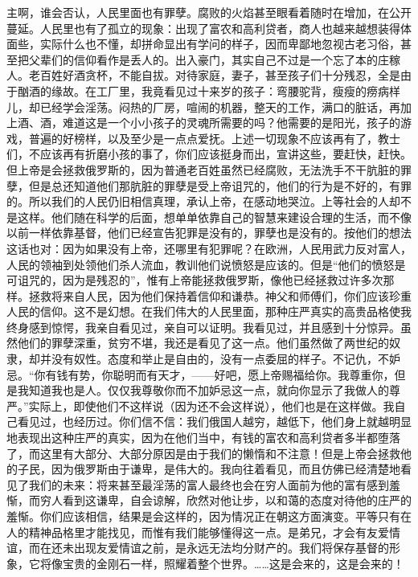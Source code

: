 \par 主啊，谁会否认，人民里面也有罪孽。腐败的火焰甚至眼看着随时在增加，在公开蔓延。人民里也有了孤立的现象：出现了富农和高利贷者，商人也越来越想装得体面些，实际什么也不懂，却拼命显出有学问的样子，因而卑鄙地忽视古老习俗，甚至把父辈们的信仰看作是丢人的。出入豪门，其实自己不过是一个忘了本的庄稼人。老百姓好酒贪杯，不能自拔。对待家庭，妻子，甚至孩子们十分残忍，全是由于酗酒的缘故。在工厂里，我竟看见过十来岁的孩子：弯腰驼背，瘦瘦的痨病样儿，却已经学会淫荡。闷热的厂房，喧闹的机器，整天的工作，满口的脏话，再加上酒、酒，难道这是一个小小孩子的灵魂所需要的吗？他需要的是阳光，孩子的游戏，普遍的好榜样，以及至少是一点点爱抚。上述一切现象不应该再有了，教士们，不应该再有折磨小孩的事了，你们应该挺身而出，宣讲这些，要赶快，赶快。但上帝是会拯救俄罗斯的，因为普通老百姓虽然已经腐败，无法洗手不干肮脏的罪孽，但是总还知道他们那肮脏的罪孽是受上帝诅咒的，他们的行为是不好的，有罪的。所以我们的人民仍旧相信真理，承认上帝，在感动地哭泣。上等社会的人却不是这样。他们随在科学的后面，想单单依靠自己的智慧来建设合理的生活，而不像以前一样依靠基督，他们已经宣告犯罪是没有的，罪孽也是没有的。按他们的想法这话也对：因为如果没有上帝，还哪里有犯罪呢？在欧洲，人民用武力反对富人，人民的领袖到处领他们杀人流血，教训他们说愤怒是应该的。但是“他们的愤怒是可诅咒的，因为是残忍的”，惟有上帝能拯救俄罗斯，像他已经拯救过许多次那样。拯救将来自人民，因为他们保持着信仰和谦恭。神父和师傅们，你们应该珍重人民的信仰。这不是幻想。在我们伟大的人民里面，那种庄严真实的高贵品格使我终身感到惊愕，我亲自看见过，亲自可以证明。我看见过，并且感到十分惊异。虽然他们的罪孽深重，贫穷不堪，我还是看见了这一点。他们虽然做了两世纪的奴隶，却并没有奴性。态度和举止是自由的，没有一点委屈的样子。不记仇，不妒忌。“你有钱有势，你聪明而有天才，——好吧，愿上帝赐福给你。我尊重你，但是我知道我也是人。仅仅我尊敬你而不加妒忌这一点，就向你显示了我做人的尊严。”实际上，即使他们不这样说（因为还不会这样说），他们也是在这样做。我自己看见过，也经历过。你们信不信：我们俄国人越穷，越低下，他们身上就越明显地表现出这种庄严的真实，因为在他们当中，有钱的富农和高利贷者多半都堕落了，而这里有大部分、大部分原因是由于我们的懒惰和不注意！但是上帝会拯救他的子民，因为俄罗斯由于谦卑，是伟大的。我向往着看见，而且仿佛已经清楚地看见了我们的未来：将来甚至最淫荡的富人最终也会在穷人面前为他的富有感到羞惭，而穷人看到这谦卑，自会谅解，欣然对他让步，以和蔼的态度对待他的庄严的羞惭。你们应该相信，结果是会这样的，因为情况正在朝这方面演变。平等只有在人的精神品格里才能找见，而惟有我们能够懂得这一点。是弟兄，才会有友爱情谊，而在还未出现友爱情谊之前，是永远无法均分财产的。我们将保存基督的形象，它将像宝贵的金刚石一样，照耀着整个世界。……这是会来的，这是会来的！
